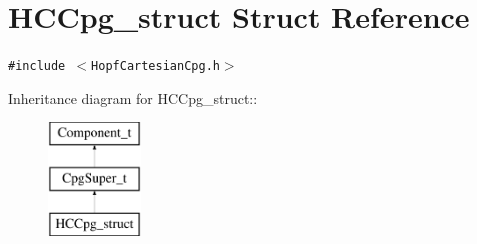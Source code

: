 \hypertarget{structHCCpg__struct}{
\section{HCCpg\_\-struct Struct Reference}
\label{structHCCpg__struct}
}
{\tt \#include $<$HopfCartesianCpg.h$>$}

Inheritance diagram for HCCpg\_\-struct::\begin{figure}[H]
\begin{center}
\leavevmode
\includegraphics[height=3cm]{structHCCpg__struct}
\end{center}
\end{figure}

